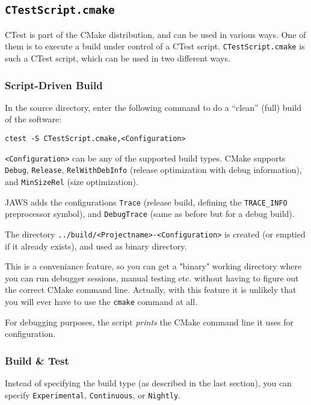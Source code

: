 \subsection{\texttt{CTestScript.cmake}}

CTest is part of the CMake distribution, and can be used in various ways. One of them is to execute a build under control of a CTest script. \lstinline{CTestScript.cmake} is such a CTest script, which can be used in two different ways.

\subsubsection{Script-Driven Build}

In the source directory, enter the following command to do a ``clean'' (full) build of the software:

\begin{lstlisting}
ctest -S CTestScript.cmake,<Configuration>
\end{lstlisting}

\lstinline{<Configuration>} can be any of the supported build types. CMake supports \lstinline{Debug}, \lstinline{Release}, \lstinline{RelWithDebInfo} (release optimization with debug information), and \lstinline{MinSizeRel} (size optimization).

JAWS adds the configurations \lstinline{Trace} (release build, defining the \lstinline{TRACE_INFO} preprocessor symbol), and \lstinline{DebugTrace} (same as before but for a debug build).

The directory \lstinline{../build/<Projectname>-<Configuration>} is created (or emptied if it already exists), and used as binary directory.

This is a conveniance feature, so you can get a "binary" working directory where you can run debugger sessions, manual testing etc. without having to figure out the correct CMake command line. Actually, with this feature it is unlikely that you will ever have to use the \lstinline{cmake} command at all.

For debugging purposes, the script \emph{prints} the CMake command line it uses for configuration.

\subsubsection{Build \& Test}

Instead of specifying the build type (as described in the last section), you can specify \lstinline{Experimental}, \lstinline{Continuous}, or \lstinline{Nightly}.

